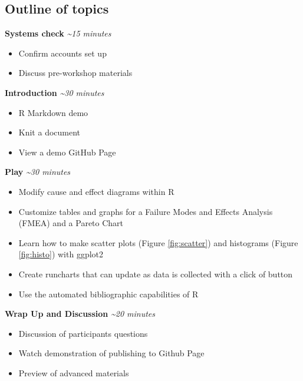 \documentclass[
]{article}
\providecommand{\tightlist}{%
  \setlength{\itemsep}{0pt}\setlength{\parskip}{0pt}}
\begin{document}
\hypertarget{outline-of-topics}{%
\subsection{Outline of topics}\label{outline-of-topics}}

\textbf{Systems check} \emph{\textasciitilde15 minutes}

\begin{itemize}
\tightlist
\item
  Confirm accounts set up
\item
  Discuss pre-workshop materials
\end{itemize}

\textbf{Introduction} \emph{\textasciitilde30 minutes}

\begin{itemize}
\tightlist
\item
  R Markdown demo
\item
  Knit a document
\item
  View a demo GitHub Page
\end{itemize}

\textbf{Play} \emph{\textasciitilde30 minutes}

\begin{itemize}
\tightlist
\item
  Modify cause and effect diagrams within R
\item
  Customize tables and graphs for a Failure Modes and Effects Analysis (FMEA) and a Pareto Chart
\item
  Learn how to make scatter plots (Figure \ref{fig:scatter}) and histograms (Figure \ref{fig:histo}) with ggplot2
\item
  Create runcharts that can update as data is collected with a click of button
\item
  Use the automated bibliographic capabilities of R
\end{itemize}

\textbf{Wrap Up and Discussion} \emph{\textasciitilde20 minutes}

\begin{itemize}
\tightlist
\item
  Discussion of participants questions
\item
  Watch demonstration of publishing to Github Page
\item
  Preview of advanced materials
\end{itemize}
\end{document}

